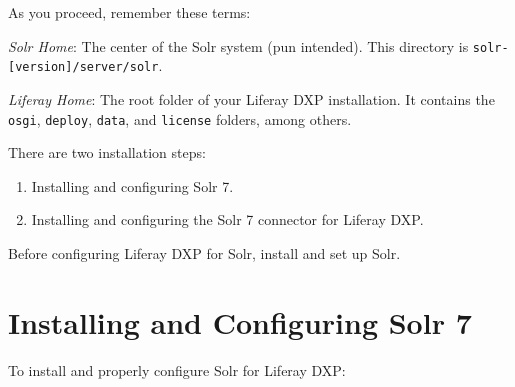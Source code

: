 As you proceed, remember these terms:

\emph{Solr Home}: The center of the Solr system (pun intended). This
directory is \texttt{solr-{[}version{]}/server/solr}.

\emph{Liferay Home}: The root folder of your Liferay DXP installation.
It contains the \texttt{osgi}, \texttt{deploy}, \texttt{data}, and
\texttt{license} folders, among others.

There are two installation steps:

\begin{enumerate}
\def\labelenumi{\arabic{enumi}.}
\item
  Installing and configuring Solr 7.
\item
  Installing and configuring the Solr 7 connector for Liferay DXP.
\end{enumerate}

Before configuring Liferay DXP for Solr, install and set up Solr.

\section{Installing and Configuring Solr
7}\label{installing-and-configuring-solr-7}

To install and properly configure Solr for Liferay DXP:

